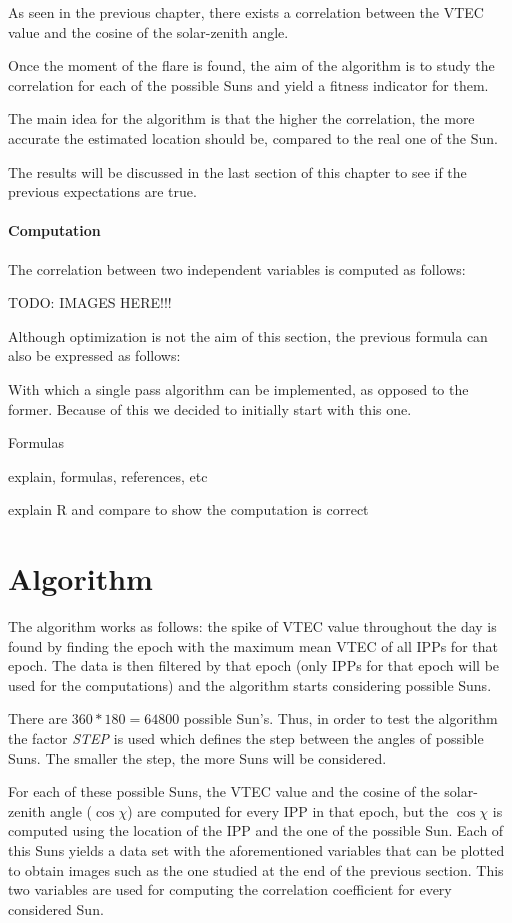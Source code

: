 As seen in the previous chapter, there exists a correlation between the VTEC value and the cosine of the solar-zenith angle. 

Once the moment of the flare is found, the aim of the algorithm is to study the correlation for each of the possible Suns and yield a fitness indicator for them. 

The main idea for the algorithm is that the higher the correlation, the more accurate the estimated location should be, compared to the real one of the Sun. 

The results will be discussed in the last section of this chapter to see if the previous expectations are true.

\paragraph{Computation}

The correlation between two independent variables is computed as follows:

TODO: IMAGES HERE!!!

Although optimization is not the aim of this section, the previous formula can also be expressed as follows:



With which a single pass algorithm can be implemented, as opposed to the former. Because of this we decided to initially start with this one.

Formulas

explain, formulas, references, etc

explain R and compare to show the computation is correct

\section{Algorithm}

The algorithm works as follows: the spike of VTEC value throughout the day is found by finding the epoch with the maximum mean VTEC of all IPPs for that epoch.
The data is then filtered by that epoch (only IPPs for that epoch will be used for the computations) and the algorithm starts considering possible Suns.

There are $360 * 180 = 64800$ possible Sun's. Thus, in order to test the algorithm the factor \textit{STEP} is used which defines the step between the angles of possible Suns. The smaller the step, the more Suns will be considered. 

For each of these possible Suns, the VTEC value and the cosine of the solar-zenith angle ($\cos \chi$) are computed for every IPP in that epoch, but the $\cos \chi$ is computed using the location of the IPP and the one of the possible Sun. Each of this Suns yields a data set with the aforementioned variables that can be plotted to obtain images such as the one studied at the end of the previous section. This two variables are used for computing the correlation coefficient for every considered Sun.

